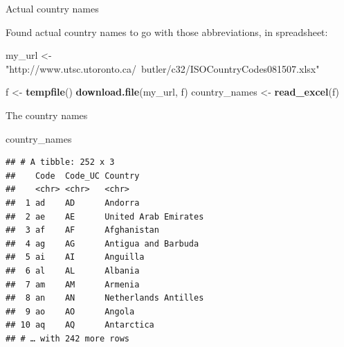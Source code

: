 \documentclass[
  ignorenonframetext,
]{beamer}
\newenvironment{Shaded}{\begin{snugshade}}{\end{snugshade}}
\newcommand{\KeywordTok}[1]{\textcolor[rgb]{0.13,0.29,0.53}{\textbf{#1}}}
\newcommand{\NormalTok}[1]{#1}
\newcommand{\StringTok}[1]{\textcolor[rgb]{0.31,0.60,0.02}{#1}}
\begin{document}
\begin{frame}[fragile]{Actual country names}
\protect\hypertarget{actual-country-names}{}

Found actual country names to go with those abbreviations, in
spreadsheet:

\footnotesize

\begin{Shaded}
\begin{Highlighting}[]
\NormalTok{my_url <-}\StringTok{ }
\StringTok{  "http://www.utsc.utoronto.ca/~butler/c32/ISOCountryCodes081507.xlsx"}
\end{Highlighting}
\end{Shaded}

\normalsize

\begin{Shaded}
\begin{Highlighting}[]
\NormalTok{f <-}\StringTok{ }\KeywordTok{tempfile}\NormalTok{()}
\KeywordTok{download.file}\NormalTok{(my_url, f)}
\NormalTok{country_names <-}\StringTok{ }\KeywordTok{read_excel}\NormalTok{(f)}
\end{Highlighting}
\end{Shaded}

\end{frame}

\begin{frame}[fragile]{The country names}
\protect\hypertarget{the-country-names}{}

\begin{Shaded}
\begin{Highlighting}[]
\NormalTok{country_names}
\end{Highlighting}
\end{Shaded}

\begin{verbatim}
## # A tibble: 252 x 3
##    Code  Code_UC Country             
##    <chr> <chr>   <chr>               
##  1 ad    AD      Andorra             
##  2 ae    AE      United Arab Emirates
##  3 af    AF      Afghanistan         
##  4 ag    AG      Antigua and Barbuda 
##  5 ai    AI      Anguilla            
##  6 al    AL      Albania             
##  7 am    AM      Armenia             
##  8 an    AN      Netherlands Antilles
##  9 ao    AO      Angola              
## 10 aq    AQ      Antarctica          
## # … with 242 more rows
\end{verbatim}

\end{frame}
\end{document}
